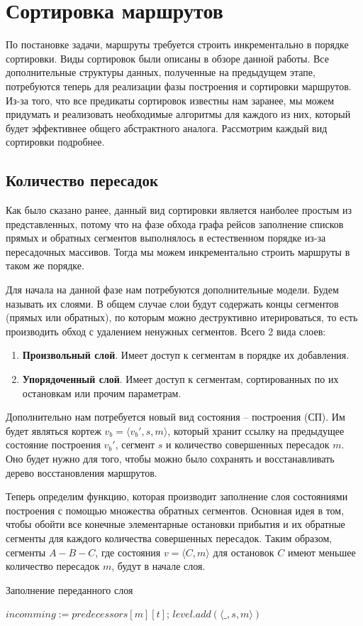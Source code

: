 \section{Сортировка маршрутов}
По постановке задачи, маршруты требуется строить инкрементально в порядке сортировки. Виды сортировок были описаны в обзоре данной работы. Все дополнительные структуры данных, полученные на предыдущем этапе, потребуются теперь для реализации фазы построения и сортировки маршрутов. Из-за того, что все предикаты сортировок известны нам заранее, мы можем придумать и реализовать необходимые алгоритмы для каждого из них, который будет эффективнее общего абстрактного аналога. Рассмотрим каждый вид сортировки подробнее.

\subsection{Количество пересадок}
Как было сказано ранее, данный вид сортировки является наиболее простым из представленных, потому что на фазе обхода графа рейсов заполнение списков прямых и обратных сегментов выполнялось в естественном порядке из-за пересадочных массивов. Тогда мы можем инкрементально строить маршруты в таком же порядке.

Для начала на данной фазе нам потребуются дополнительные модели. Будем называть их слоями. В общем случае слои будут содержать концы сегментов (прямых или обратных), по которым можно деструктивно итерироваться, то есть производить обход с удалением ненужных сегментов. Всего 2 вида слоев:
\begin{enumerate}
	\item \textbf{Произвольный слой}. Имеет доступ к сегментам в порядке их добавления.
	\item \textbf{Упорядоченный слой}. Имеет доступ к сегментам, сортированных по их остановкам или прочим параметрам.
\end{enumerate}

Дополнительно нам потребуется новый вид состояния -- построения (СП). Им будет являться кортеж $v_b=\langle v_b', s, m \rangle$, который хранит ссылку на предыдущее состояние построения $v_b'$, сегмент $s$ и количество совершенных пересадок $m$. Оно будет нужно для того, чтобы можно было сохранять и восстанавливать дерево восстановления маршрутов.

Теперь определим функцию, которая производит заполнение слоя состояниями построения с помощью множества обратных сегментов. Основная идея в том, чтобы обойти все конечные элементарные остановки прибытия и их обратные сегменты для каждого количества совершенных пересадок. Таким образом, сегменты $A-B-C$, где состояния $v=\langle C, m \rangle$ для остановок $C$ имеют меньшее количество пересадок $m$, будут в начале слоя.
\begin{algorithm}[!h]
	\caption{Заполнение переданного слоя}\label{lst5}
	\begin{algorithmic}
			\State $incomming := predecessors[m][t]$;
				\State $level.add(\langle \_, s, m \rangle)$
			\EndFor
		\EndFor
		\EndFunction
	\end{algorithmic}
\end{algorithm}

